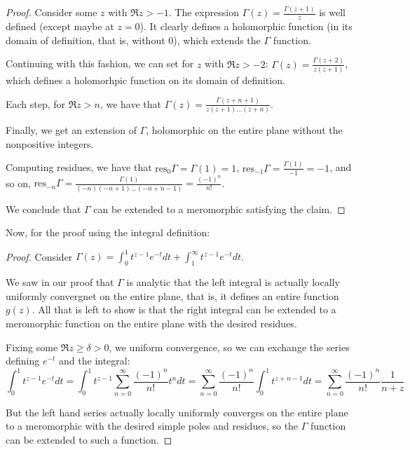 \documentclass[11pt]{article} %
\theoremstyle{definition}
\theoremstyle{remark}
\newcommand{\res}{\text{res}}
\begin{document}
\begin{proof}
Consider some $z$ with $\Re z > -1$. The expression $\Gamma\left(z\right) = \frac{\Gamma\left(z+1\right)}{z}$ is well defined (except maybe at $z = 0$). It clearly defines a holomorphic function (in its domain of definition, that is, without $0$), which extends the $\Gamma$ function.

Continuing with this fashion, we can set for $z$ with $\Re z > -2$: $\Gamma\left(z\right) = \frac{\Gamma\left(z+2\right)}{z\left(z+1\right)}$, which defines a holomorhpic function on its domain of definition.

Each step, for $\Re z > n$, we have that $\Gamma\left(z\right) = \frac{\Gamma\left(z + n + 1\right)}{z\left(z+1\right)\dots\left(z + n\right)}$.

Finally, we get an extension of $\Gamma$, holomorphic on the entire plane without the nonpositive integers.

Computing residues, we have that $\res_0 \Gamma = \Gamma\left(1\right) = 1$, $\res_{-1}\Gamma = \frac{\Gamma\left(1\right)}{-1} = -1$, and so on, $\res_{-n}\Gamma= \frac{\Gamma\left(1\right)}{\left(-n\right)\left(-n+1\right)\dots\left(-n+n-1\right)} = \frac{\left(-1\right)^n}{n!}$.

We conclude that $\Gamma$ can be extended to a meromorphic satisfying the claim.
\end{proof}

Now, for the proof using the integral definition:

\begin{proof}
Consider $\Gamma\left(z\right) = \int_0 ^1 t^{z-1}e^{-t}dt + \int_1^\infty t^{z-1}e^{-t}dt$.

We saw in our proof that $\Gamma$ is analytic that the left integral is actually locally uniformly convergnet on the entire plane, that is, it defines an entire function $g\left(z\right)$. All that is left to show is that the right integral can be extended to a meromorphic function on the entire plane with the desired residues.

Fixing some $\Re z \geq \delta >0$, we uniform convergence, so we can exchange the series defining $e^{-t}$ and the integral:
\[ \int_0 ^1 t^{z-1} e^{-t} dt = \int _0 ^1 t^{z-1} \sum_{n=0}^\infty \frac{\left(-1\right)^n}{n!} t^n dt = \sum_{n=0}^\infty \frac{\left(-1\right)^n}{n!} \int_0^1 t^{z+n-1}dt = \sum_{n=0}^\infty \frac{\left(-1\right)^n}{n!}\frac{1}{n+z} \]

But the left hand series actually locally uniformly converges on the entire plane to a meromorphic with the desired simple poles and residues, so the $\Gamma$ function can be extended to such a function.
\end{proof}
\end{document}
